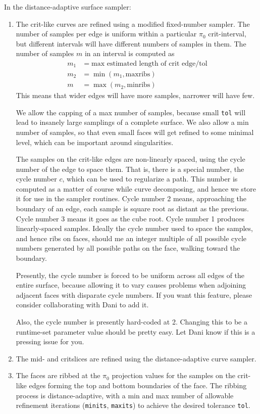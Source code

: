 In the distance-adaptive surface sampler:
\begin{enumerate}
\item The crit-like curves are refined using a modified fixed-number sampler.  The number of samples per edge is uniform within a particular $\pi_0$ crit-interval, but different intervals will have different numbers of samples in them.  The number of samples $m$ in an interval is computed as
\begin{align*}
m_1 &= \text{max estimated length of crit edge} / \text{tol} \\
m_2 &= \min(m_1, \text{maxribs}) \\
m &= \max(m_2, \text{minribs})
\end{align*}
This means that wider edges will have more samples, narrower will have few.

We allow the capping of a max number of samples, because small {\tt tol} will lead to insanely large samplings of a complete surface.  We also allow a min number of samples, so that even small faces will get refined to some minimal level, which can be important around singularities.

The samples on the crit-like edges are non-linearly spaced, using the cycle number of the edge to space them.  That is, there is a special number, the cycle number $c$, which can be used to regularize a path.  This number is computed as a matter of course while curve decomposing, and hence we store it for use in the sampler routines.  Cycle number 2 means, approaching the boundary of an edge, each sample is square root as distant as the previous.  Cycle number 3 means it goes as the cube root.  Cycle number 1 produces linearly-spaced samples.  Ideally the cycle number used to space the samples, and hence ribs on faces, should me an integer multiple of all possible cycle numbers generated by all possible paths on the face, walking toward the boundary.

Presently, the cycle number is forced to be uniform across all edges of the entire surface, because allowing it to vary causes problems when adjoining adjacent faces with disparate cycle numbers.  If you want this feature, please consider collaborating with Dani to add it.

Also, the cycle number is presently hard-coded at 2.  Changing this to be a runtime-set parameter value should be pretty easy.  Let Dani know if this is a pressing issue for you.



\item  The mid- and critslices are refined using the distance-adaptive curve sampler.

\item The faces are ribbed at the $\pi_0$ projection values for the samples on the crit-like edges forming the top and bottom boundaries of the face.  The ribbing process is distance-adaptive, with a min and max number of allowable refinement iterations ({\tt minits}, {\tt maxits}) to achieve the desired tolerance {\tt tol}.
\end{enumerate}


